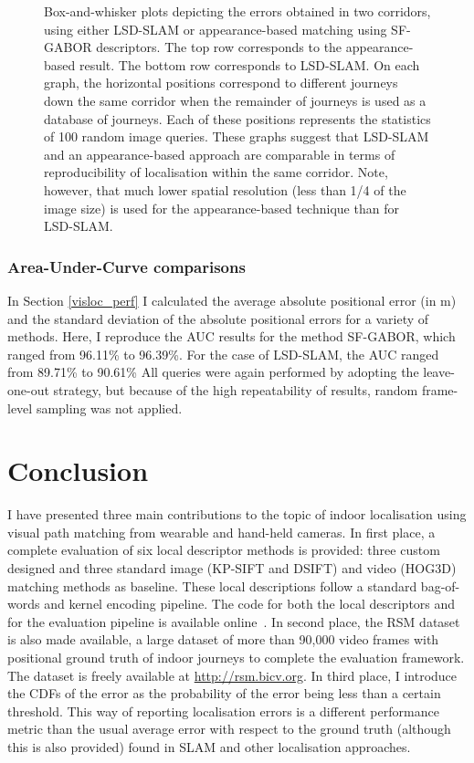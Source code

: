 \begin{figure}
\caption{Box-and-whisker plots depicting the errors obtained in two corridors, using either LSD-SLAM or appearance-based matching using SF-GABOR descriptors. The top row corresponds to the appearance-based result. The bottom row corresponds to LSD-SLAM. On each graph, the horizontal positions correspond to different journeys down the same corridor when the remainder of journeys is used as a database of journeys. Each of these positions represents the statistics of 100 random image queries. These graphs suggest that LSD-SLAM and an appearance-based approach are comparable in terms of reproducibility of localisation within the same corridor. Note, however, that much lower spatial resolution (less than 1/4 of the image size) is used for the appearance-based technique than for LSD-SLAM.}
\label{fig:reprod}
\end{figure}

\subsubsection{Area-Under-Curve comparisons}
In Section \ref{visloc_perf} I calculated the average absolute positional error (in m) and the standard deviation of the absolute positional errors for a variety of methods. Here, I reproduce the AUC results for the method SF-GABOR, which ranged from 96.11\% to 96.39\%. For the case of LSD-SLAM, the AUC ranged from 89.71\% to 90.61\% All queries were again performed by adopting the leave-one-out strategy, but because of the high repeatability of results, random frame-level sampling was not applied.  




\section{Conclusion}

I have presented three main contributions to the topic of indoor localisation using visual path matching from wearable and hand-held cameras. In first place, a complete evaluation of six local descriptor methods is provided: three custom designed and three standard image (KP-SIFT and DSIFT) and video (HOG3D) matching methods as baseline. These local descriptions follow a standard bag-of-words and kernel encoding pipeline. The code for both the local descriptors and for the evaluation pipeline is available online~\cite{jose_rivera_rubio_2015_33762}. In second place, the RSM dataset is also made available, a large dataset of more than 90,000 video frames with positional ground truth of indoor journeys to complete the evaluation framework. The dataset is freely available at \url{http://rsm.bicv.org}. In third place, I introduce the CDFs of the error as the probability of the error being less than a certain threshold. This way of reporting localisation errors is a different performance metric than the usual average error with respect to the ground truth (although this is also provided) found in SLAM and other localisation approaches.


